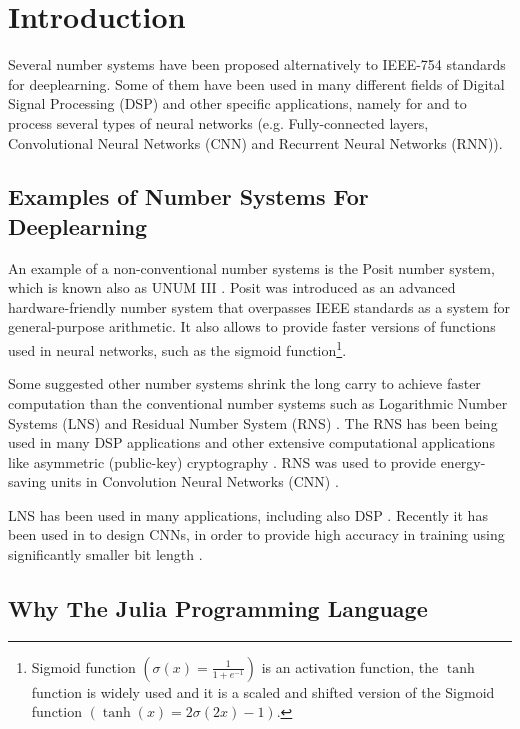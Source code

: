 \section{Introduction}

Several number systems have been proposed alternatively to IEEE-754 standards \cite{754} for deeplearning. Some of them have been used in many different fields of Digital Signal Processing (DSP) and other specific applications, namely for and to process several types of neural networks (e.g. Fully-connected layers, Convolutional Neural Networks (CNN) and Recurrent Neural Networks (RNN)).

\subsection{Examples of Number Systems For Deeplearning}

An example of a non-conventional number systems is the Posit number system, which is known also as UNUM III \cite{Gustafson2017}. Posit was introduced as an advanced hardware-friendly number system that overpasses IEEE standards as a system for general-purpose arithmetic. It also allows to provide faster versions of functions used in neural networks, such as the sigmoid function\footnote{Sigmoid function $\left(\sigma(x) = \frac{1}{1 + e^{-1}}\right)$ is an activation function, the $\tanh$ function is widely used and it is a scaled and shifted version of the Sigmoid function $\left(\tanh(x) = 2 \sigma(2x) -1\right)$.}.

Some suggested other number systems shrink the long carry to achieve faster computation than the conventional number systems such as Logarithmic Number Systems (LNS) \cite{Kingsbury1971} and Residual Number System (RNS) \cite{Garner1959}. The RNS has been being used in many DSP applications \cite{Cardarilli2007,Chaves2003,Claudio1995,DiClaudio1990,Jullien1987} and other extensive computational applications like asymmetric (public-key) cryptography \cite{Sousa2016}. RNS was used to provide energy-saving units in Convolution Neural Networks (CNN) \cite{Samimi2020}.

LNS \cite{Kingsbury1971,Alexopoulos1975,Lee1977} has been used in many applications, including also DSP \cite{Dimitrov2001,Lewis1995}. Recently it has been used in to design CNNs, in order to provide high accuracy in training using significantly smaller bit length \cite{Miyashita2016,Juang2019}.

\subsection{Why The Julia Programming Language}

